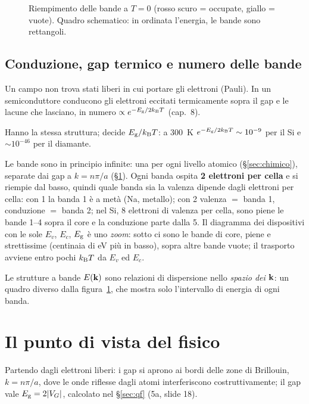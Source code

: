 \documentclass[11pt,a4paper]{article}
\begin{document}
\begin{figure}[tbp]
\centering
{}
\caption{Riempimento delle bande a $T=0$ (rosso scuro = occupate, giallo = vuote). Quadro schematico: in ordinata l'energia, le bande sono
rettangoli.}\label{fig:riemp}
\end{figure}

\subsection{Conduzione, gap termico e numero delle bande}
Un campo non trova stati liberi in cui portare gli elettroni (Pauli). In un semiconduttore conducono gli elettroni eccitati termicamente sopra il gap
e le lacune che lasciano, in numero $\propto e^{-E_{\mathrm g}/2k_{\mathrm B} T}$ (cap.~8).

Hanno la stessa struttura; decide $E_{\mathrm g}/k_{\mathrm B} T$: a \SI{300}{K} $e^{-E_{\mathrm g}/2k_{\mathrm B} T}\sim10^{-9}$ per il Si e $\sim10^{-46}$ per il diamante.

Le bande sono in principio infinite: una per ogni livello atomico (§\ref{sec:chimico}), separate dai gap a $k=n\pi/a$ (§\ref{sec:fisico}). Ogni banda
ospita \textbf{2 elettroni per cella} e si riempie dal basso, quindi quale banda sia la valenza dipende dagli elettroni per cella: con 1 la banda 1 è a
metà (Na, metallo); con 2 valenza $=$ banda 1, conduzione $=$ banda 2; nel Si, 8 elettroni di valenza per cella, sono piene le bande 1--4 sopra il core
e la conduzione parte dalla 5. Il diagramma dei dispositivi con le sole $E_v$, $E_c$, $E_{\mathrm g}$ è uno \emph{zoom}: sotto ci sono le bande di core, piene e
strettissime (centinaia di eV più in basso), sopra altre bande vuote; il trasporto avviene entro pochi $k_{\mathrm B} T$ da $E_v$ ed $E_c$.

\begin{osservazione}
Le strutture a bande $E(\mathbf k)$ sono relazioni di dispersione nello \emph{spazio dei $\mathbf k$}: un quadro diverso dalla figura~\ref{fig:riemp}, che
mostra solo l'intervallo di energia di ogni banda.
\end{osservazione}

\section{Il punto di vista del fisico}\label{sec:fisico}
Partendo dagli elettroni liberi: i gap si aprono ai bordi delle zone di Brillouin, $k=n\pi/a$, dove le onde riflesse dagli atomi interferiscono
costruttivamente; il gap vale $E_{\mathrm g}=2|V_G|$, calcolato nel §\ref{sec:qf} (5a, slide 18).
\end{document}
